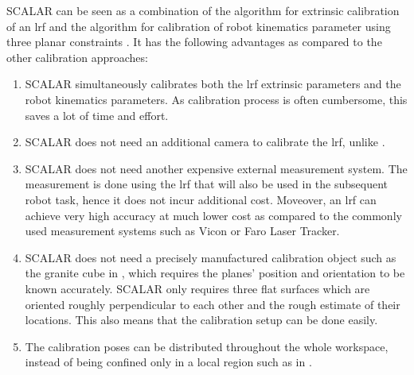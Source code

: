 SCALAR can be seen as a combination of the algorithm for extrinsic calibration of an \ac{lrf} \cite{Zhang2004} and the algorithm for calibration of robot kinematics parameter using three planar constraints \cite{Joubair2015}. It has the following advantages as compared to the other calibration approaches:
\begin{enumerate}
\item SCALAR simultaneously calibrates both the \ac{lrf} extrinsic parameters and the robot kinematics parameters. As calibration process is often cumbersome, this saves a lot of time and effort.
\item SCALAR does not need an additional camera to calibrate the \ac{lrf}, unlike \cite{Zhang2004}.
\item SCALAR does not need another expensive external measurement system. The measurement is done using the \ac{lrf} that will also be used in the subsequent robot task, hence it does not incur additional cost. Moveover, an \ac{lrf} can achieve very high accuracy at much lower cost as compared to the commonly used measurement systems such as Vicon or Faro Laser Tracker. 
\item SCALAR does not need a precisely manufactured calibration object such as the granite cube in \cite{Joubair2015}, which requires the planes' position and orientation to be known accurately. SCALAR only requires
three flat surfaces which are oriented roughly perpendicular to each other and the rough estimate of their locations. This also means that the calibration setup can be done easily.
\item The calibration poses can be distributed throughout the whole workspace, instead of being confined only in a local region such as in \cite{Joubair2015}. 
\end{enumerate}



